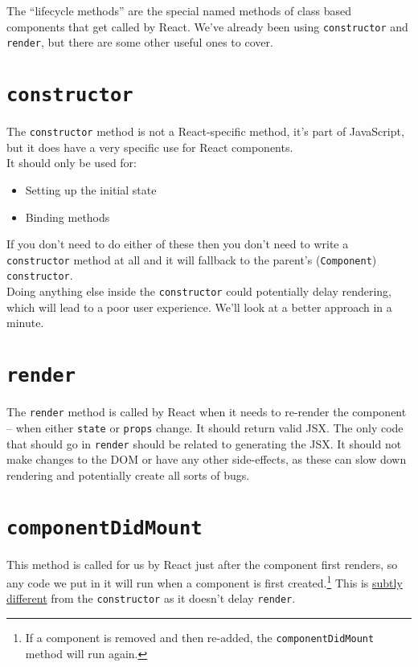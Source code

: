The ``lifecycle methods'' are the special named methods of class based components that get called by React. We've already been using \texttt{constructor} and \texttt{render}, but there are some other useful ones to cover.


\section{\texttt{constructor}}

The \texttt{constructor} method is not a React-specific method, it's part of JavaScript, but it does have a very specific use for React components.
\\

It should only be used for:

\begin{itemize}
    \item Setting up the initial state
    \item Binding methods
\end{itemize}

If you don't need to do either of these then you don't need to write a \texttt{constructor} method at all and it will fallback to the parent's (\texttt{Component}) \texttt{constructor}.
\\

Doing anything else inside the \texttt{constructor} could potentially delay rendering, which will lead to a poor user experience. We'll look at a better approach in a minute.


\section{\texttt{render}}

The \texttt{render} method is called by React when it needs to re-render the component – when either \texttt{state} or \texttt{props} change. It should return valid JSX. The only code that should go in \texttt{render} should be related to generating the JSX. It should not make changes to the DOM or have any other side-effects, as these can slow down rendering and potentially create all sorts of bugs.



\section{\texttt{componentDidMount}}

This method is called for us by React just after the component first renders, so any code we put in it will run when a component is first created.\footnote{If a component is removed and then re-added, the \texttt{componentDidMount} method will run again.} This is \href{https://medium.com/@mahcloud/actions-in-the-constructor-or-componentdidmount-be3720e4a9a6}{subtly different} from the \texttt{constructor} as it doesn't delay \texttt{render}.
\\

